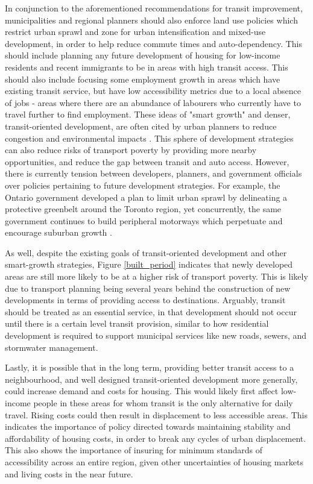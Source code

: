 \documentclass[11 pt, letterpaper]{article}
\begin{document}
{In conjunction to the aforementioned recommendations for transit improvement, municipalities and regional planners should also enforce land use policies which restrict urban sprawl and zone for urban intensification and mixed-use development, in order to help reduce commute times and auto-dependency. This should include planning any future development of housing for low-income residents and recent immigrants to be in areas with high transit access. This should also include focusing some employment growth in areas which have existing transit service, but have low accessibility metrics due to a local absence of jobs - areas where there are an abundance of labourers who currently have to travel further to find employment. These ideas of "smart growth" and denser, transit-oriented development, are often cited by urban planners to reduce congestion and environmental impacts \cite{bernick1997}. This sphere of development strategies can also reduce risks of transport poverty by providing more nearby opportunities, and reduce the gap between transit and auto access. However, there is currently tension between developers, planners, and government officials over policies pertaining to future development strategies. For example, the Ontario government developed a plan to limit urban sprawl by delineating a protective greenbelt around the Toronto region, yet concurrently, the same government continues to build peripheral motorways which perpetuate and encourage suburban growth \cite{macdonald2012}. 

As well, despite the existing goals of transit-oriented development and other smart-growth strategies, Figure \ref{built_period} indicates that newly developed areas are still more likely to be at a higher risk of transport poverty. This is likely due to transport planning being several years behind the construction of new developments in terms of providing access to destinations. Arguably, transit should be treated as an essential service, in that development should not occur until there is a certain level transit provision, similar to how residential development is required to support municipal services like new roads, sewers, and stormwater management.

Lastly, it is possible that in the long term, providing better transit access to a neighbourhood, and well designed transit-oriented development more generally, could increase demand and costs for housing. This would likely first affect low-income people in these areas for whom transit is the only alternative for daily travel. Rising costs could then result in displacement to less accessible areas. This indicates the importance of policy directed towards maintaining stability and affordability of housing costs, in order to break any cycles of urban displacement. This also shows the importance of insuring for minimum standards of accessibility across an entire region, given other uncertainties of housing markets and living costs in the near future.




}
\end{document}
